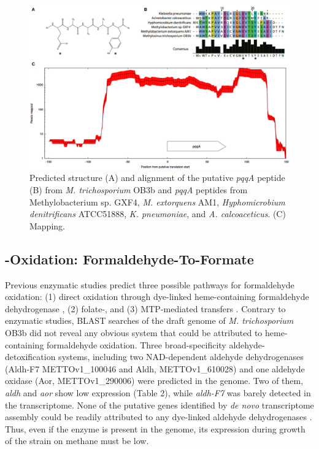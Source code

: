 \begin{figure}[H]
\centering
     \includegraphics[width=1.0\textwidth]{./tex/chapter1/figures/figure2.png}
     \begin{singlespace}
     \caption[\textit{pqqA} structure, alignment, and RNA-seq coverage]{
        Predicted structure
        (A) and alignment of the putative \textit{pqqA} peptide
        (B) from \textit{M. trichosporium} OB3b and \textit{pqqA} peptides from Methylobacterium sp. GXF4, \textit{M. extorquens} AM1,
            \textit{Hyphomicrobium denitrificans} ATCC51888, \textit{K. pneumoniae}, and \textit{A. calcoaceticus}.
        (C) Mapping.}
     \label{fig:B_pqqA}  %
     \end{singlespace}
\end{figure}


\subsection{-Oxidation: Formaldehyde-To-Formate}
Previous enzymatic studies predict three possible pathways for formaldehyde oxidation: (1) direct oxidation through dye-linked heme-containing formaldehyde dehydrogenase \cite{patel1980}, (2) folate-, and (3) MTP-mediated  transfers \cite{vorholt1999, doronina2008}.
Contrary to enzymatic studies, BLAST searches of the draft genome of \textit{M. trichosporium} OB3b did not reveal any obvious system that could be attributed to heme-containing formaldehyde oxidation.
Three broad-specificity aldehyde-detoxification systems, including two NAD-dependent aldehyde dehydrogenases (Aldh-F7 METTOv1\_100046 and Aldh, METTOv1\_610028) and one aldehyde oxidase (Aor, METTOv1\_290006) were predicted in the genome.
Two of them, \textit{aldh} and \textit{aor} show low expression (Table 2), while \textit{aldh-F7} was barely detected in the transcriptome.
None of the putative genes identified by \textit{de novo} transcriptome assembly could be readily attributed to any dye-linked aldehyde dehydrogenases \cite{schwartz2004}.
Thus, even if the enzyme is present in the genome, its expression during growth of the strain on methane must be low.

